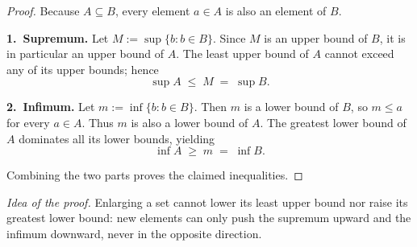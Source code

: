 \documentclass[10pt]{extarticle}
\begin{document}
\begin{proof}
    Because $A \subseteq B$, every element $a\in A$ is also an element of $B$.

    \medskip
    \textbf{1.~Supremum.}  Let $M := \sup\{b : b \in B\}$.  Since $M$ is an upper bound of $B$, it is in particular an upper bound of $A$.  The least upper bound of $A$ cannot exceed any of its upper bounds; hence
    \[
        \sup A \;\le\; M \;=\; \sup B.
    \]

    \medskip
    \textbf{2.~Infimum.}  Let $m := \inf\{b : b \in B\}$.  Then $m$ is a lower bound of $B$, so $m \le a$ for every $a \in A$.  Thus $m$ is also a lower bound of $A$.  The greatest lower bound of $A$ dominates all its lower bounds, yielding
    \[
        \inf A \;\ge\; m \;=\; \inf B.
    \]

    \medskip
    Combining the two parts proves the claimed inequalities.
\end{proof}

\begin{remark}
    \emph{Idea of the proof.}  Enlarging a set cannot lower its least upper bound nor raise its greatest lower bound: new elements can only push the supremum upward and the infimum downward, never in the opposite direction.
\end{remark}
\end{document}
